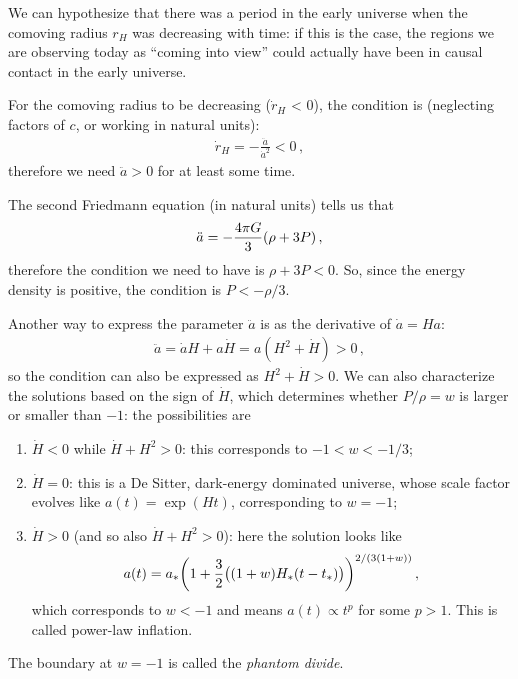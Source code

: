 \documentclass[main.tex]{subfiles}
\begin{document}
We can hypothesize that there was a period in the early universe when the comoving radius \(r_H\) was decreasing with time: if this is the case, the regions we are observing today as ``coming into view'' could actually have been in causal contact in the early universe.

For the comoving radius to be decreasing (\(\dot{r}_H\) < 0), the condition is (neglecting factors of \(c\), or working in natural units):
%
\begin{align}
  \dot{r}_H = - \frac{ \ddot{a} }{\dot{a}^2} <0
\,,
\end{align}
%
therefore we need \(\ddot{a} >0\) for at least some time.

The second Friedmann equation (in natural units) tells us that
%
\begin{align}
  \ddot{a} = -\frac{4 \pi G }{3} \qty(\rho + 3P)
\,,
\end{align}
%
therefore the condition we need to have is \(\rho + 3P <0\).
So, since the energy density is positive, the condition is \(P < - \rho /3\).

Another way to express the parameter \(\ddot{a}\) is as the derivative of \(\dot{a} = Ha\):
%
\begin{align}
  \ddot{a} = \dot{a}H + a \dot{H} = a (H^2 + \dot{H})>0
\,,
\end{align}
%
so the condition can also be expressed as \(H^2+ \dot{H} >0\).
We can also characterize the solutions based on the sign of \(\dot{H}\), which determines whether \(P / \rho = w\) is larger or smaller than \(-1\): the possibilities are
\begin{enumerate}
    \item \(\dot{H} < 0\) while \(\dot{H} + H^2 >0\): this corresponds to \(-1 < w < -1/3\);
    \item \(\dot{H} =0\): this is a De Sitter, dark-energy dominated universe, whose scale factor evolves like \(a(t) = \exp(Ht) \), corresponding to \(w = -1\);
    \item \(\dot{H} >0\) (and so also \(\dot{H} + H^2 > 0\)): here the solution looks like
    \begin{align}
      a(t) = a_{*} \qty(1 + \frac{3}{2}\qty((1+w)H_{*}\qty(t-t_{*})))^{2/ (3(1+w))}
    \,,
    \end{align}
    which corresponds to \(w<-1\) and means \(a(t) \propto t^{p}\) for some \(p>1\). This is called power-law inflation.
\end{enumerate}

The boundary at \(w = -1\) is called the \emph{phantom divide}.
\end{document}
